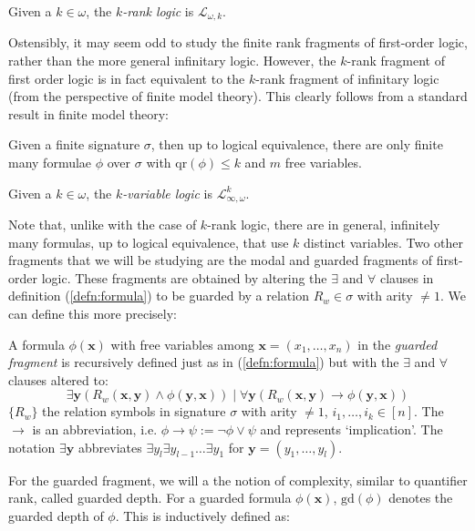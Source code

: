 \begin{defn}
Given a $k \in \omega$, the \textit{$k$-rank logic} is $\mathcal{L}_{\omega,k}$. 
\end{defn}
Ostensibly, it may seem odd to study the finite rank fragments of first-order logic, rather than the more general infinitary logic. However, the $k$-rank fragment of first order logic is in fact equivalent to the $k$-rank fragment of infinitary logic (from the perspective of finite model theory). This clearly follows from a standard result in finite model theory:
\begin{prop}
Given a finite signature $\sigma$, then up to logical equivalence, there are only finite many formulae $\phi$ over $\sigma$ with $\text{qr}(\phi)\leq k$ and $m$ free variables.
\end{prop}
\begin{defn}
Given a $k \in \omega$, the \textit{$k$-variable logic} is $\mathcal{L}^{k}_{\infty,\omega}$.
\end{defn}
Note that, unlike with the case of $k$-rank logic, there are in general, infinitely many formulas, up to logical equivalence, that use $k$ distinct variables. Two other fragments that we will be studying are the modal and guarded fragments of first-order logic. These fragments are obtained by altering the $\exists$ and $\forall$ clauses in definition (\ref{defn:formula}) to be guarded by a relation $R_{w} \in \sigma$ with arity $\not= 1$. We can define this more precisely: 
\begin{defn}
A formula $\phi(\mathbf{x})$ with free variables among $\mathbf{x} = (x_{1},\dots,x_{n})$ in the \textit{guarded fragment} is recursively defined just as in (\ref{defn:formula}) but with the $\exists$ and $\forall$ clauses altered to:  
$$ \exists \mathbf{y} (R_{w}(\mathbf{x},\mathbf{y}) \wedge \phi(\mathbf{y},\mathbf{x})) \mid \forall \mathbf{y}(R_{w}(\mathbf{x},\mathbf{y}) \rightarrow \phi(\mathbf{y},\mathbf{x}))$$
$\{R_{w}\}$ the relation symbols in signature $\sigma$ with arity $\not= 1$, $i_{1},\dots,i_{k} \in [n]$. The $\rightarrow$ is an abbreviation, i.e. $\phi \rightarrow \psi := \neg \phi \vee \psi$ and represents `implication'. The notation $\exists \mathbf{y}$ abbreviates $\exists y_{l} \exists y_{l-1} \dots \exists y_{1}$ for $\mathbf{y} = (y_{1},\dots,y_{l})$.
\end{defn}
For the guarded fragment, we will a the notion of complexity, similar to quantifier rank, called guarded depth. For a guarded formula $\phi(\mathbf{x})$, $\text{gd}(\phi)$ denotes the guarded depth of $\phi$. This is inductively defined as:   
